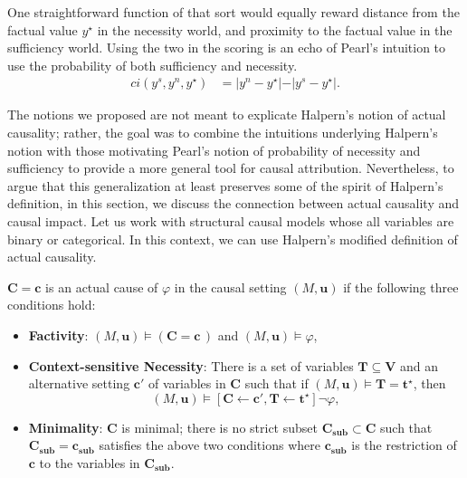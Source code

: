 \documentclass[anon,12pt]{clear2025} %
\begin{document}
\begin{example} \label{ex:absolute_score}
One straightforward function of that sort would equally reward distance from the factual value $y^\star$ in the necessity world, and proximity to the factual value in the sufficiency world. Using the two in the scoring is an echo of Pearl's intuition to use the probability of both sufficiency and necessity.
\begin{align*}
ci(y^s, y^n, y^\star) & = \vert y^n - y^\star \vert   - \vert y^s - y ^\star \vert. 
\end{align*}
\end{example}






\newpage


The notions we proposed are not meant to explicate Halpern's notion of actual causality; rather, the goal was to combine the intuitions underlying Halpern's notion with those motivating Pearl's notion of probability of necessity and sufficiency to provide a more general tool for causal attribution. Nevertheless, to argue that this generalization at least preserves some of the spirit of Halpern's definition, in this section, we discuss the connection between actual causality and causal impact. Let us work with structural causal models whose all variables are binary or categorical.  In this context, we can use Halpern's modified definition of actual causality.

\begin{definition} \label{def:ac}
    \(\mathbf{C} = \mathbf{c}\) is an actual cause of \(\varphi\) in the causal setting \((M, \mathbf{u})\) if the following three conditions hold:
    \begin{itemize}
        \item \textbf{Factivity}: \((M, \mathbf{u}) \vDash (\mathbf{C} = \mathbf{c}\,)\) and \((M, \mathbf{u}) \vDash \varphi\),
        \item \textbf{Context-sensitive Necessity}: There is a set of variables \(\mathbf{T} \subseteq \mathbf{V}\) and an alternative setting \(\mathbf{c'}\) of variables in \(\mathbf{C}\) such that if \((M, \mathbf{u}) \vDash \mathbf{T} = \mathbf{t^\star}\), then
            \[(M, \mathbf{u}) \vDash [\mathbf{C} \leftarrow \mathbf{c'}, \mathbf{T} \leftarrow \mathbf{t^\star}] \neg \varphi,\]

\vspace{-3mm}
    
        \item \textbf{Minimality}: \(\mathbf{C}\) is minimal; there is no strict subset \(\mathbf{C_{sub}} \subset \mathbf{C}\) such that \(\mathbf{C_{sub}} = \mathbf{c_{sub}}\) satisfies the above two conditions where $\mathbf{c_{sub}}$ is the restriction of \(\mathbf{c}\) to the variables in \(\mathbf{C_{sub}}\). 
    \end{itemize}
\end{definition}
\end{document}

